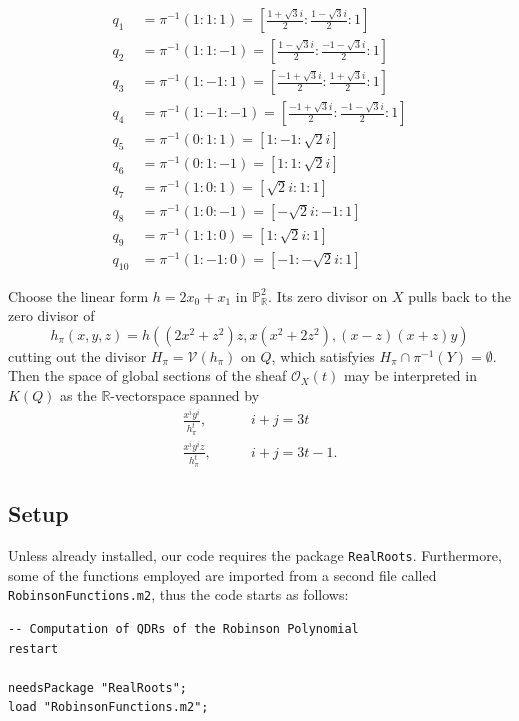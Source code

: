 \documentclass[a4paper,10pt]{amsart}
\theoremstyle{definition}
\theoremstyle{plain}
\newcommand{\cO}{{\mathcal O}}
\newcommand{\cV}{{\mathcal V}}
\newcommand{\R}{{\mathbb R}}
\newcommand{\pp}{\mathbb{P}}
\begin{document}
\begin{align*}
    q_1 &= \pi^{-1}(1:1:1) = [\frac{1+\sqrt{3}i}{2}:\frac{1-\sqrt{3}i}{2}:1] \\
    q_2 &= \pi^{-1}(1:1:-1) = [\frac{1-\sqrt{3}i}{2}:\frac{-1-\sqrt{3}i}{2}:1] \\
    q_3 &= \pi^{-1}(1:-1:1) = [\frac{-1+\sqrt{3}i}{2}:\frac{1+\sqrt{3}i}{2}:1] \\
    q_4 &= \pi^{-1}(1:-1:-1) = [\frac{-1+\sqrt{3}i}{2}:\frac{-1-\sqrt{3}i}{2}:1] \\
    q_5 &= \pi^{-1}(0:1:1) = [1:-1:\sqrt{2}i] \\
    q_6 &= \pi^{-1}(0:1:-1) = [1:1:\sqrt{2}i] \\
    q_7 &= \pi^{-1}(1:0:1) = [\sqrt{2}i:1:1] \\
    q_8 &= \pi^{-1}(1:0:-1) = [-\sqrt{2}i:-1:1] \\
    q_9 &= \pi^{-1}(1:1:0) = [1:\sqrt{2}i:1] \\
    q_{10} &= \pi^{-1}(1:-1:0) = [-1:-\sqrt{2}i:1]
\end{align*}

Choose the linear form $h = 2x_0 + x_1$ in $\pp^2_\R$. Its zero divisor on $X$ pulls back to the zero divisor of
\begin{equation*}
 h_\pi(x,y,z) = h((2x^2+z^2)z,x(x^2+2z^2),(x-z)(x+z)y)
\end{equation*}
cutting out the divisor $H_\pi = \cV(h_\pi)$ on $Q$, which satisfyies $H_\pi \cap \pi^{-1}(Y) = \emptyset$. Then the space of global sections of the sheaf $\cO_X(t)$ may be interpreted in $K(Q)$ as the $\R$-vectorspace spanned by
\begin{align*}
 \frac{x^iy^i}{h_\pi^t}, &\qquad i+j=3t \\
 \frac{x^iy^iz}{h_\pi^t}, &\qquad i+j=3t-1.
\end{align*}


\subsection{Setup}

Unless already installed, our code requires the package \texttt{RealRoots}. Furthermore, some of the functions employed are imported from a second file called \texttt{RobinsonFunctions.m2}, thus the code starts as follows:

\begin{oframed}
\begin{verbatim}
-- Computation of QDRs of the Robinson Polynomial
restart

needsPackage "RealRoots";
load "RobinsonFunctions.m2";
\end{verbatim}
\end{oframed}
\end{document}

